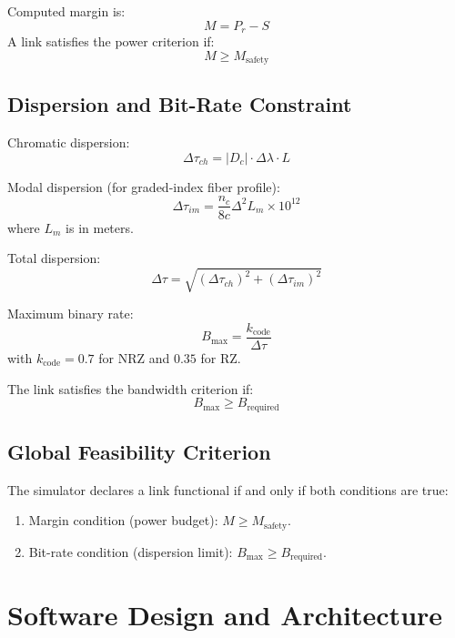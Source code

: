 \documentclass[11pt,a4paper]{article}
\begin{document}
Computed margin is:
\begin{equation}
M = P_r - S
\end{equation}
A link satisfies the power criterion if:
\begin{equation}
M \ge M_{\text{safety}}
\end{equation}

\subsection{Dispersion and Bit-Rate Constraint}
Chromatic dispersion:
\begin{equation}
\Delta\tau_{ch} = |D_c| \cdot \Delta\lambda \cdot L
\end{equation}

Modal dispersion (for graded-index fiber profile):
\begin{equation}
\Delta\tau_{im} = \frac{n_c}{8c}\Delta^2 L_m \times 10^{12}
\end{equation}
where $L_m$ is in meters.

Total dispersion:
\begin{equation}
\Delta\tau = \sqrt{(\Delta\tau_{ch})^2 + (\Delta\tau_{im})^2}
\end{equation}

Maximum binary rate:
\begin{equation}
B_{\max} = \frac{k_{\text{code}}}{\Delta\tau}
\end{equation}
with $k_{\text{code}}=0.7$ for NRZ and $0.35$ for RZ.

The link satisfies the bandwidth criterion if:
\begin{equation}
B_{\max} \ge B_{\text{required}}
\end{equation}

\subsection{Global Feasibility Criterion}
The simulator declares a link functional if and only if both conditions are true:
\begin{enumerate}[leftmargin=1.2cm]
  \item Margin condition (power budget): $M \ge M_{\text{safety}}$.
  \item Bit-rate condition (dispersion limit): $B_{\max} \ge B_{\text{required}}$.
\end{enumerate}

\section{Software Design and Architecture}
\end{document}
